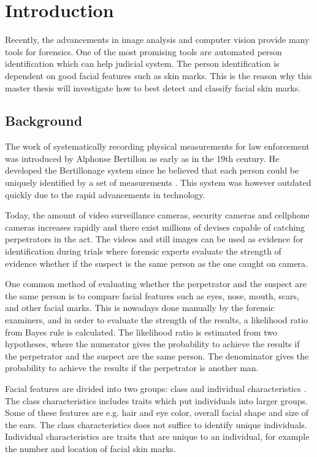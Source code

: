 \chapter{Introduction}\label{cha:intro}

Recently, the advancements in image analysis and computer vision provide many tools for forensics. One of the most promising tools are automated person identification which can help judicial system. The person identification is dependent on good facial features such as skin marks. This is the reason why this master thesis will investigate how to best detect and classify facial skin marks. 

\section{Background}

The work of systematically recording physical measurements for law enforcement was introduced by Alphonse Bertillon as early as in the 19th century. He developed the Bertillonage system since he believed that each person could be uniquely identified by a set of measurements \cite{Bertillon}. This system was however outdated quickly due to the rapid advancements in technology.

Today, the amount of video surveillance cameras, security cameras and cellphone cameras increases rapidly and there exist millions of devises capable of catching perpetrators in the act. The videos and still images can be used as evidence for identification during trials where forensic experts evaluate the strength of evidence whether if the suspect is the same person as the one caught
on camera.

One common method of evaluating whether the perpetrator and the suspect are the same person is to compare facial features such as eyes, nose, mouth, scars, and other facial marks. This is nowadays done manually \cite{face_soft} by the forensic examiners, and in order to evaluate the strength of the results, a likelihood ratio \cite{NFC_stat} from Bayes rule is calculated. The likelihood ratio is estimated from two hypotheses, where the numerator gives the probability to achieve the results if the perpetrator and the suspect are the same person. The denominator gives the probability to achieve the results if the perpetrator is another man. 

Facial features are divided into two groups: class and individual characteristics \cite{forensic_identification}. The class characteristics includes traits which put individuals into larger groups. Some of these features are e.g. hair and eye color, overall facial shape and size of the ears. The class characteristics does not suffice to identify unique individuals. Individual characteristics are traits that are unique to an individual, for example the number and location of facial skin marks.

